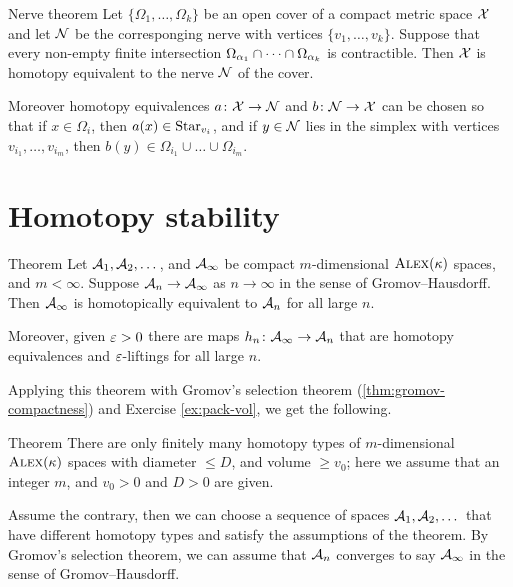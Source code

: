 \begin{thm}{Nerve theorem}\label{thm:nerve}
Let $\{\Omega_1,\dots,\Omega_k\}$ be an open cover of a compact metric space $\mathcal{X}$
and let $\mathcal{N}$ be the corresponging nerve with vertices $\{v_1,\dots,v_k\}$.
Suppose that every non-empty finite intersection $\Omega_{\alpha_1}\cap\dots\cap\Omega_{\alpha_k}$ is contractible.
Then $\mathcal{X}$ is homotopy equivalent to the nerve $\mathcal{N}$ of the cover.

Moreover homotopy equivalences  $a\colon\mathcal{X}\to \mathcal{N}$ and $b\colon\mathcal{N}\to\mathcal{X}$ can be chosen so that 
if $x\in \Omega_i$, then $a(x)\in \mathop{\rm Star}\nolimits_{v_i}$,
and if $y\in\mathcal{N}$ lies in the simplex with vertices $v_{i_1},\dots, v_{i_m}$, then $b(y)\in \Omega_{i_1}\cup\dots\cup \Omega_{i_m}$.
\end{thm}



\section{Homotopy stability}

\begin{thm}{Theorem}\label{thm:h-stability}
Let $\mathcal{A}_1,\mathcal{A}_2,\dots$, and $\mathcal{A}_\infty$ be compact $m$-dimensional $\textsc{Alex}(\kappa)$ spaces, and $m<\infty$.
Suppose $\mathcal{A}_n\to \mathcal{A}_\infty$ as $n\to \infty$ in the sense of Gromov--Hausdorff.
Then $\mathcal{A}_\infty$ is homotopically equivalent to $\mathcal{A}_n$ for all large $n$.

Moreover, given $\varepsilon>0$ there are maps $h_n\colon\mathcal{A}_\infty\to \mathcal{A}_n$ that are homotopy equivalences and $\varepsilon$-liftings for all large $n$.
\end{thm}

Applying this theorem with Gromov's selection theorem (\ref{thm:gromov-compactness}) and Exercise \ref{ex:pack-vol}, we get the following.


\begin{thm}{Theorem}\label{thm:h-finiteness}
There are only finitely many homotopy types of $m$-dimensional $\textsc{Alex}(\kappa)$ spaces with diameter $\le D$, and volume $\ge v_0$;
here we assume that an integer $m$, and $v_0>0$ and $D>0$ are given.
\end{thm}

Assume the contrary, then we can choose a sequence of spaces $\mathcal{A}_1,\mathcal{A}_2,\dots$ that have different homotopy types and satisfy the assumptions of the theorem.
By Gromov's selection theorem, we can assume that $\mathcal{A}_n$ converges to say $\mathcal{A}_\infty$ in the sense of Gromov--Hausdorff.

